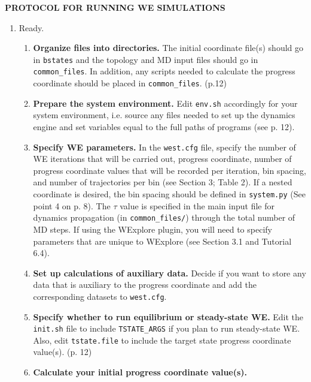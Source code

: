 \documentclass[9pt,tutorial,pubversion]{livecoms}
\begin{document}
\newpage
\onecolumn
\begin{center}
\begin{LARGE}
    \textbf{PROTOCOL FOR RUNNING WE SIMULATIONS}
\end{LARGE}
\end{center}
\renewcommand{\theenumi}{\Roman{enumi}}
\renewcommand{\labelenumi}{\theenumi}
\renewcommand{\theenumii}{\arabic{enumii}}
\renewcommand{\labelenumii}{(\theenumii)}
\begin{enumerate}
\item Ready.
\begin{enumerate}
\item \textbf{Organize files into directories.} 
The initial coordinate file(s) should go in \verb|bstates| and the topology and MD input files should go in \verb|common_files|. 
In addition, any scripts needed to calculate the progress coordinate should be placed in \verb|common_files|. (p.12)
\item \textbf{Prepare the system environment.}  
Edit \verb|env.sh| accordingly for your system environment, i.e. source any files needed to set up the dynamics engine and set variables equal to the full paths of programs (see p. 12). 
\item \textbf{Specify WE parameters.}  
In the \verb|west.cfg| file, specify the number of WE iterations that will be carried out, progress coordinate, number of progress coordinate values that will be recorded per iteration, bin spacing, and number of trajectories per bin (see Section 3; Table 2).  
If a nested coordinate is desired, the bin spacing should be defined in \verb|system.py| (See point 4 on p. 8).  
The $\tau$ value is specified in the main input file for dynamics propagation (in \verb|common_files/|) through the total number of MD steps.  
If using the WExplore plugin, you will need to specify parameters that are unique to WExplore (see Section 3.1 and Tutorial 6.4).
\item \textbf{Set up calculations of auxiliary data.} 
Decide if you want to store any data that is auxiliary to the progress coordinate and add the corresponding datasets to \verb|west.cfg|.
\item \textbf{Specify whether to run equilibrium or steady-state WE.}
Edit the \verb|init.sh| file to include \verb|TSTATE_ARGS| if you plan to run steady-state WE.  
Also, edit \verb|tstate.file| to include the target state progress coordinate value(s). (p. 12) 
\item \textbf{Calculate your initial progress coordinate value(s).}

\end{enumerate}
\end{enumerate}
\end{document}
